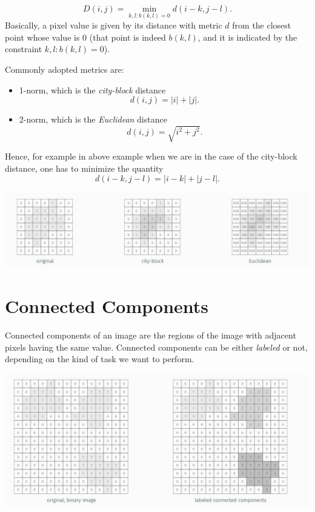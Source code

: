 \documentclass[10pt]{report}
\begin{document}
\[D(i, j) = \min_{k, l: b(k, l) = 0} d(i-k, j-l).\] Basically, a pixel
value is given by its distance with metric \(d\) from the closest point
whose value is \(0\) (that point is indeed \(b(k, l)\), and it is
indicated by the constraint \(k, l: b(k, l) = 0\)).

Commonly adopted metrics are:

\begin{itemize}
\item 1-norm, which is the \emph{city-block} distance \[d(i, j) = |i| + |j|.\]
\item 2-norm, which is the \emph{Euclidean} distance
\[d(i, j) = \sqrt{i^2 + j^2}.\]
\end{itemize}

Hence, for example in above example when we are in the case of the
city-block distance, one has to minimize the quantity
\[d(i-k, j-l) = |i - k| + |j - l|.\]

\begin{center}
\includegraphics[width=.9\linewidth]{./pics/proc/distance-transform.jpg}
\end{center}

\section{Connected Components}
\label{connected-components}
Connected components of an image are the regions of the image with
adjacent pixels having the same value. Connected components can be
either \emph{labeled} or not, depending on the kind of task we want to
perform.

\begin{center}
\includegraphics[width=.9\linewidth]{./pics/proc/connected-components.jpg}
\end{center}
\end{document}
